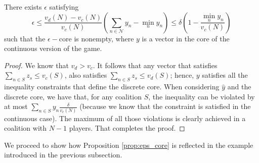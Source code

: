 \documentclass[sigconf, table]{acmart}
\begin{document}
\begin{proposition}\label{prop:eps_core}
  There exists $\epsilon$ satisfying
  $$\epsilon \leq \frac{v_d(N) - v_c(N)}{v_c(N)}\left( \sum_{n\in\mathcal{N}} y_n - \min_n{y_n}\right) \leq \delta\left( 1 - \frac{\min_n y_n}{v_c(N)} \right)   $$
  such that the $\epsilon-$core is nonempty, where $y$ is a vector in the core of the continuous version of the game.
\end{proposition}

\begin{proof}
We know that $v_d > v_c$. It follows that any vector that satisfies $\sum_{n \in S} z_s \leq v_c(S)$, also satisfies $\sum_{n \in S} z_s \leq v_d(S)$; hence, $y$ satisfies all the inequality constraints that define the discrete core. 
When considering $\hat{y}$ and the discrete core, we have that, for any coalition $S$, the inequality can be violated by at most $\sum_{n \in S} y_n\frac{\delta}{v_c(N)}$ (because we know that the constraint is satisfied in the continuous case). The maximum of all those violations is clearly achieved in a coalition with $N-1$ players. That completes the proof.
\end{proof}

We proceed to show how Proposition \ref{prop:eps_core} is reflected in the example introduced in the previous subsection.
\end{document}
